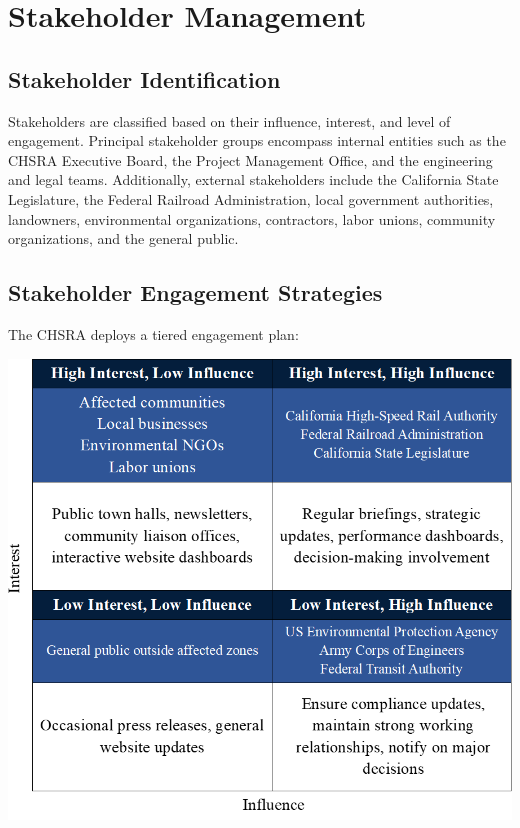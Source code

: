 \chapter{Stakeholder Management}
\section{Stakeholder Identification}
\parindent20pt Stakeholders are classified based on their influence, interest, and level of engagement. Principal stakeholder groups encompass internal entities such as the CHSRA Executive Board, the Project Management Office, and the engineering and legal teams. Additionally, external stakeholders include the California State Legislature, the Federal Railroad Administration, local government authorities, landowners, environmental organizations, contractors, labor unions, community organizations, and the general public.

\section{Stakeholder Engagement Strategies}
The CHSRA deploys a tiered engagement plan: \par
\vspace*{0.2em}
\noindent 
\begin{center}
\includegraphics[width=\linewidth]{./attachments/lowhi}
\end{center}\par \justifying

